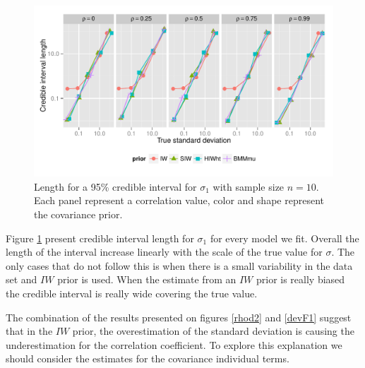 \documentclass[a4paper]{article}
\begin{document}
\begin{figure}[htbp]
   \centering
   \includegraphics[width=\textwidth]{cilength_s1}
    \vspace{-.5in}
   \caption{Length for a 95\% credible interval for $\sigma_1$ with sample size $n=10$. Each panel represent a correlation value,  color and shape represent the covariance prior. \label{devF3} }
\end{figure}
Figure \ref{devF3} present credible interval length for $\sigma_1$ for every model we fit. Overall the length of the interval increase linearly with the scale of the true value for $\sigma$. The only cases that do not follow this is when there is a small variability in the data set and $IW$ prior is used. When the estimate from an $IW$  prior is really biased the credible interval is really wide covering the true value. 

The combination of the results presented on figures \ref{rhod2} and \ref{devF1}  suggest that in the $IW$ prior, the overestimation of the standard deviation is causing the underestimation for the correlation coefficient. To explore this explanation we should consider the estimates for the covariance individual terms. 
\end{document}
